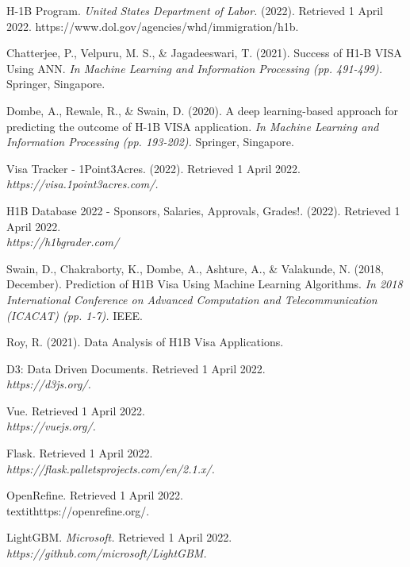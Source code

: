 \documentclass[sigconf]{acmart}
\begin{document}
\begin{thebibliography}{12}

\bibitem{} 
	H-1B Program. 
\textit{United States Department of Labor.} 
(2022). 
Retrieved 1 April 2022. https://www.dol.gov/agencies/whd/immigration/h1b. 

\bibitem{}
Chatterjee, P., Velpuru, M. S., \& Jagadeeswari, T. 
(2021). 
Success of H1-B VISA Using ANN. 
\textit{In Machine Learning and Information Processing (pp. 491-499).}
 Springer, Singapore.

\bibitem{}
Dombe, A., Rewale, R., \& Swain, D. 
(2020). 
A deep learning-based approach for predicting the outcome of H-1B VISA application. 
\textit{In Machine Learning and Information Processing (pp. 193-202).}
 Springer, Singapore.

\bibitem{}
Visa Tracker - 1Point3Acres. 
(2022). 
Retrieved 1 April 2022.  
\\\textit{https://visa.1point3acres.com/. }

\bibitem{}
H1B Database 2022 - Sponsors, Salaries, Approvals, Grades!. 
(2022). 
Retrieved 1 April 2022. 
\\\textit{https://h1bgrader.com/}


\bibitem{}
Swain, D., Chakraborty, K., Dombe, A., Ashture, A., \& Valakunde, N. 
(2018, December). 
Prediction of H1B Visa Using Machine Learning Algorithms. 
\textit{In 2018 International Conference on Advanced Computation and Telecommunication (ICACAT) (pp. 1-7).} 
IEEE. 

\bibitem{}
Roy, R. (2021). 
Data Analysis of H1B Visa Applications.

\bibitem{}
D3: Data Driven Documents. 
Retrieved 1 April 2022. 
\\\textit{https://d3js.org/.}

\bibitem{}
Vue. 
Retrieved 1 April 2022. 
\\\textit{https://vuejs.org/.}

\bibitem{}
Flask. 
Retrieved 1 April 2022. 
\\\textit{https://flask.palletsprojects.com/en/2.1.x/.}

\bibitem{}
OpenRefine. 
Retrieved 1 April 2022. 
\\textit{https://openrefine.org/.}

\bibitem{}
LightGBM. 
\textit{Microsoft.} 
Retrieved 1 April 2022. 
\\\textit{https://github.com/microsoft/LightGBM.}

\end{thebibliography}
\end{document}
